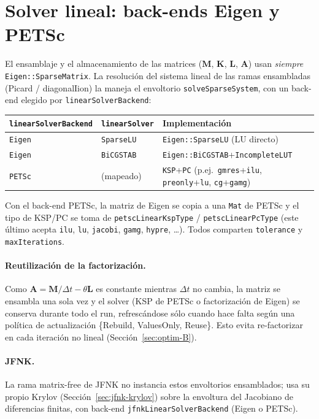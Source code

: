 \documentclass[11pt,a4paper]{article}
\newcommand{\code}[1]{\texttt{\small #1}}
\newcommand{\Mmass}{\mathbf{M}}
\newcommand{\Kstif}{\mathbf{K}}
\newcommand{\Lop}{\mathbf{L}}
\newcommand{\Aimp}{\mathbf{A}}
\begin{document}
\section{Solver lineal: back-ends Eigen y PETSc}
\label{sec:linalg}

El ensamblaje y el almacenamiento de las matrices ($\Mmass$, $\Kstif$, $\Lop$,
$\Aimp$) usan \emph{siempre} \code{Eigen::SparseMatrix}. La resolución del sistema
lineal de las ramas ensambladas (Picard / diagonalIion) la maneja el envoltorio
\code{solveSparseSystem}, con un back-end elegido por \code{linearSolverBackend}:

\begin{center}
\begin{tabular}{@{}lll@{}}
\toprule
\code{linearSolverBackend} & \code{linearSolver} & Implementación \\
\midrule
\code{Eigen} & \code{SparseLU}  & \code{Eigen::SparseLU} (LU directo) \\
\code{Eigen} & \code{BiCGSTAB}  & \code{Eigen::BiCGSTAB}+\code{IncompleteLUT} \\
\code{PETSc} & (mapeado)        & \code{KSP}+\code{PC} (p.ej.\ \code{gmres}+\code{ilu},
   \code{preonly}+\code{lu}, \code{cg}+\code{gamg}) \\
\bottomrule
\end{tabular}
\end{center}

Con el back-end PETSc, la matriz de Eigen se copia a una \code{Mat} de PETSc y el
tipo de KSP/PC se toma de \code{petscLinearKspType} / \code{petscLinearPcType}
(este último acepta \code{ilu}, \code{lu}, \code{jacobi}, \code{gamg}, \code{hypre},
\dots). Todos comparten \code{tolerance} y \code{maxIterations}.

\paragraph{Reutilización de la factorización.}
Como $\Aimp=\Mmass/\Delta t-\theta\Lop$ es constante mientras $\Delta t$ no cambia,
la matriz se ensambla una sola vez y el solver (KSP de PETSc o factorización de
Eigen) se conserva durante todo el run, refrescándose sólo cuando hace falta según
una política de actualización \{Rebuild, ValuesOnly, Reuse\}. Esto evita
re-factorizar en cada iteración no lineal (Sección~\ref{sec:optim-B}).

\paragraph{JFNK.}
La rama matrix-free de JFNK no instancia estos envoltorios ensamblados; usa su
propio Krylov (Sección~\ref{sec:jfnk-krylov}) sobre la envoltura del Jacobiano de
diferencias finitas, con back-end \code{jfnkLinearSolverBackend} (Eigen o PETSc).
\end{document}
